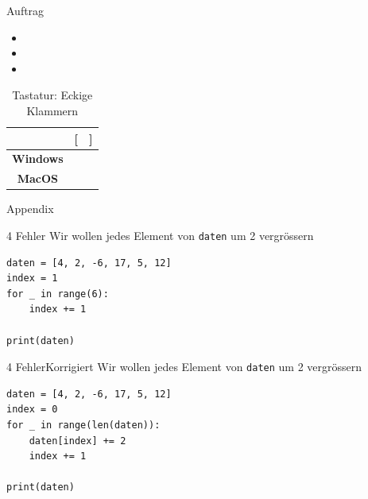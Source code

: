 \begin{frame}[fragile]{Auftrag}
	\begin{itemize}
		\item {}
		\item {}
		\item {}
	\end{itemize}
	\begin{table}[H]
		\centering
		\begin{tabular}{c||c|c}
			                 & [               & ]               \\\midrule\midrule
			\textbf{Windows} & \keys{\AltGr+ü} & \keys{\AltGr+!} \\\midrule
			\textbf{MacOS}   & \keys{\Alt+5}   & \keys{\Alt+6}   \\
		\end{tabular}
		\caption*{Tastatur: Eckige Klammern}
	\end{table}
\end{frame}

\begin{frame}{Appendix}
	
\end{frame}
\begin{frame}[fragile]{4 Fehler}
	Wir wollen jedes Element von \lstinline|daten| um 2 vergrössern
	\begin{lstlisting}
daten = [4, 2, -6, 17, 5, 12] 
index = 1
for _ in range(6):
	index += 1
	
print(daten)
\end{lstlisting}
\end{frame}

\begin{frame}[fragile]{4 Fehler}{Korrigiert}
	Wir wollen jedes Element von \lstinline|daten| um 2 vergrössern
	\begin{lstlisting}
daten = [4, 2, -6, 17, 5, 12] 
index = 0
for _ in range(len(daten)):
	daten[index] += 2
	index += 1
	
print(daten)
\end{lstlisting}
\end{frame}

